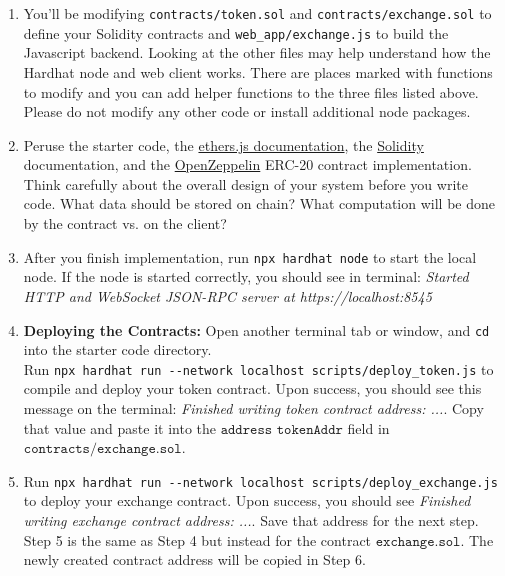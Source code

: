 \documentclass[11pt]{article}
\begin{document}
\begin{enumerate}
    \item You'll be modifying \verb|contracts/token.sol| and \verb|contracts/exchange.sol| to define your Solidity contracts and \verb|web_app/exchange.js| to build the Javascript backend. Looking at the other files may help understand how the Hardhat node and web client works. There are places marked with functions to modify and you can add helper functions to the three files listed above. Please do not modify any other code or install additional node packages.
    \item Peruse the starter code, the \hyperlink{https://docs.ethers.io/v5/}{ethers.js documentation}, the \hyperlink{https://docs.soliditylang.org/en/v0.8.17/}{Solidity} documentation, and the \hyperlink{https://docs.openzeppelin.com/contracts/4.x/erc20}{OpenZeppelin} ERC-20 contract implementation. Think carefully about the overall design of your system before you write code. What data should be stored on chain? What computation will be done by the contract vs. on the client?
    \item After you finish implementation, run \verb|npx hardhat node| to start the local node. If the node is started correctly, you should see in terminal: \textit{Started HTTP and WebSocket JSON-RPC server at https://localhost:8545}
    \item \textbf{Deploying the Contracts:} Open another terminal tab or window, and \verb|cd| into the starter code directory. \\Run \verb|npx hardhat run --network localhost scripts/deploy_token.js| to compile and deploy your token contract. Upon success, you should see this message on the terminal: \textit{Finished writing token contract address: ...}. Copy that value and paste it into the ${\texttt{address tokenAddr}}$ field in ${\texttt{contracts/exchange.sol}}$. 
 
    \item Run \verb|npx hardhat run --network localhost scripts/deploy_exchange.js| to deploy your exchange contract. Upon success, you should see \textit{Finished writing exchange contract address: ...}. Save that address for the next step. \\
    Step 5 is the same as Step 4 but instead for the contract ${\texttt{exchange.sol}}$. The newly created contract address will be copied in Step 6.
    

\end{enumerate}
\end{document}
